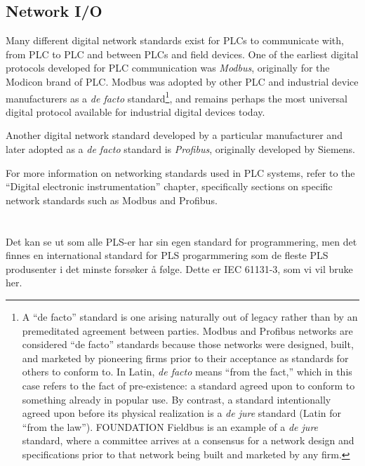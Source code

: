 \filbreak
\subsection{Network I/O}

Many different digital network standards exist for PLCs to communicate with, from PLC to PLC and between PLCs and field devices.  One of the earliest digital protocols developed for PLC communication was \textit{Modbus}, originally for the Modicon brand of PLC.  Modbus was adopted by other PLC and industrial device manufacturers as a \textit{de facto} standard\footnote{A ``de facto'' standard is one arising naturally out of legacy rather than by an premeditated agreement between parties.  Modbus and Profibus networks are considered ``de facto'' standards because those networks were designed, built, and marketed by pioneering firms prior to their acceptance as standards for others to conform to.  In Latin, \textit{de facto} means ``from the fact,'' which in this case refers to the fact of pre-existence: a standard agreed upon to conform to something already in popular use.  By contrast, a standard intentionally agreed upon before its physical realization is a \textit{de jure} standard (Latin for ``from the law'').  FOUNDATION Fieldbus is an example of a \textit{de jure} standard, where a committee arrives at a consensus for a network design and specifications prior to that network being built and marketed by any firm.}, and remains perhaps the most universal digital protocol available for industrial digital devices today.   

Another digital network standard developed by a particular manufacturer and later adopted as a \textit{de facto} standard is \textit{Profibus}, originally developed by Siemens.  

For more information on networking standards used in PLC systems, refer to the ``Digital electronic instrumentation'' chapter, specifically sections on specific network standards such as Modbus and Profibus.










\filbreak
\section{}

Det kan se ut som alle PLS-er har sin egen standard for programmering, men det finnes en international standard for PLS progarmmering som de fleste PLS produsenter i det minste forsøker å følge. Dette er IEC 61131-3, som vi vil bruke her.

